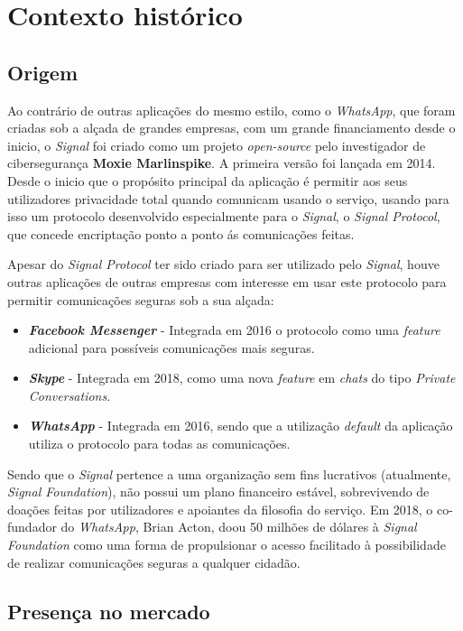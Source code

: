 
\section{Contexto histórico}

\subsection{Origem}     %
Ao contrário de outras aplicações do mesmo estilo, como o \textit{WhatsApp}, que foram criadas sob a alçada de grandes empresas, com um grande financiamento desde o inicio, o \textit{Signal} foi criado como um projeto \textit{open-source} pelo investigador de cibersegurança \textbf{Moxie Marlinspike}. A primeira versão foi lançada em 2014. Desde o inicio que o propósito principal da aplicação é permitir aos seus utilizadores privacidade total quando comunicam usando o serviço, usando para isso um protocolo desenvolvido especialmente para o \textit{Signal}, o \textit{Signal Protocol}, que concede encriptação ponto a ponto ás comunicações feitas.

Apesar do \textit{Signal Protocol} ter sido criado para ser utilizado pelo \textit{Signal}, houve outras aplicações de outras empresas com interesse em usar este protocolo para permitir comunicações seguras sob a sua alçada:

\begin{itemize}
   \item \textbf{\textit{Facebook Messenger}} - Integrada em 2016 o protocolo como uma \textit{feature} adicional para possíveis comunicações mais seguras.
   
   \item \textbf{\textit{Skype}} - Integrada em 2018, como uma nova \textit{feature} em \textit{chats} do tipo \textit{Private Conversations}.
   
   \item \textbf{\textit{WhatsApp}} - Integrada em 2016, sendo que a utilização \textit{default} da aplicação utiliza o protocolo para todas as comunicações. 
\end{itemize}

Sendo que o \textit{Signal} pertence a uma organização sem fins lucrativos (atualmente, \textit{Signal Foundation}), não possui um plano financeiro estável, sobrevivendo de doações feitas por utilizadores e apoiantes da filosofia do serviço. Em 2018, o co-fundador do \textit{WhatsApp}, Brian Acton, doou 50 milhões de dólares à \textit{Signal Foundation} como uma forma de propulsionar o acesso facilitado à possibilidade de realizar comunicações seguras a qualquer cidadão. \cite{history}


\subsection{Presença no mercado}
